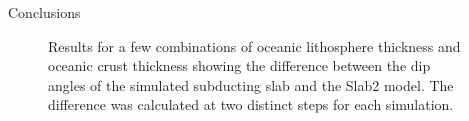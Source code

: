 \documentclass[final]{beamer}
\newlength{\colwidth}
\begin{document}
\begin{frame}[t]
\begin{columns}[t]
\begin{column}{\colwidth}
\begin{block}{Conclusions}
    \begin{figure}
		\centering
  		\qquad
	\caption{Results for a few combinations of oceanic lithosphere thickness and oceanic crust thickness showing the difference between the dip angles of the simulated subducting slab and the Slab2 model. The difference was calculated at two distinct steps for each simulation.}
	\label{fig:conclusions}
	\end{figure}

  \end{block}


\end{column}
\end{columns}
\end{frame}
\end{document}
